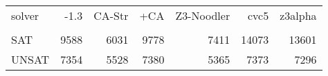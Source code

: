 \begin{tabular}{lrrrrrr}
\toprule
solver & \Ostrich{}-1.3 & CA-Str & \Ostrich{}+CA & Z3-Noodler & cvc5 & z3alpha \\
 &  &  &  &  &  &  \\
\midrule
SAT & 9588 & 6031 & 9778 & 7411 & 14073 & 13601 \\
UNSAT & 7354 & 5528 & 7380 & 5365 & 7373 & 7296 \\
\bottomrule
\end{tabular}
